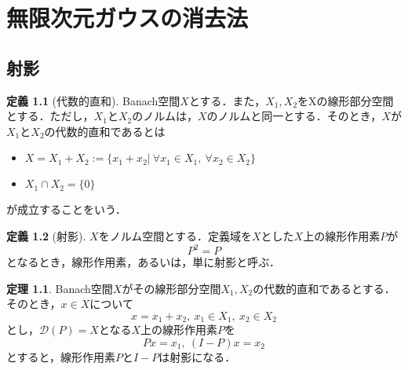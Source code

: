 \documentclass[11pt,a4paper,titlepage]{jsreport}
\theoremstyle{definition}
\newtheorem{dfn}{定義}
\newtheorem{thm}{定理}
\begin{document}
%

\chapter{無限次元ガウスの消去法}
\section{射影}

\begin{dfn}[代数的直和]
  Banach空間$X$とする．また，$X_1,X_2$をXの線形部分空間とする．ただし，$X_1$と$X_2$のノルムは，$X$のノルムと同一とする．そのとき，$X$が$X_1$と$X_2$の代数的直和であるとは
  \begin{itemize}
    \item $X=X_1+X_2:=\{x_1+x_2 | \  \forall x_1 \in X_1, \ \forall x_2 \in X_2 \}$
    \item $X_1 \cap X_2 = \{0\}$
  \end{itemize}
  が成立することをいう．
\end{dfn}

\begin{dfn}[射影]
  $X$をノルム空間とする．定義域を$X$とした$X$上の線形作用素$P$が
  \begin{equation*}
    P^2=P
  \end{equation*}
  となるとき，線形作用素，あるいは，単に射影と呼ぶ．
\end{dfn}

\begin{thm}
  Banach空間$X$がその線形部分空間$X_1,X_2$の代数的直和であるとする．そのとき，$x\in X$について
  \begin{equation*}
    x=x_1+x_2,\ x_1 \in X_1,\ x_2 \in X_2
  \end{equation*}
とし，$\mathcal{D}(P)=X$となる$X$上の線形作用素$P$を
\begin{equation*}
  Px=x_1,\ (I-P)x=x_2
\end{equation*}
とすると，線形作用素$P$と$I-P$は射影になる．
\end{thm}
\end{document}
